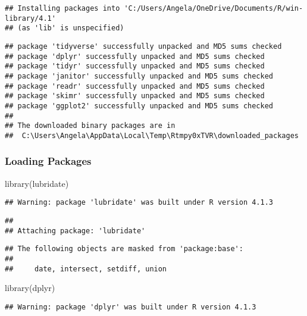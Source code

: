 \documentclass[
]{article}
\newenvironment{Shaded}{\begin{snugshade}}{\end{snugshade}}
\newcommand{\FunctionTok}[1]{\textcolor[rgb]{0.00,0.00,0.00}{#1}}
\newcommand{\NormalTok}[1]{#1}
\begin{document}
\begin{verbatim}
## Installing packages into 'C:/Users/Angela/OneDrive/Documents/R/win-library/4.1'
## (as 'lib' is unspecified)
\end{verbatim}

\begin{verbatim}
## package 'tidyverse' successfully unpacked and MD5 sums checked
## package 'dplyr' successfully unpacked and MD5 sums checked
## package 'tidyr' successfully unpacked and MD5 sums checked
## package 'janitor' successfully unpacked and MD5 sums checked
## package 'readr' successfully unpacked and MD5 sums checked
## package 'skimr' successfully unpacked and MD5 sums checked
## package 'ggplot2' successfully unpacked and MD5 sums checked
## 
## The downloaded binary packages are in
##  C:\Users\Angela\AppData\Local\Temp\Rtmpy0xTVR\downloaded_packages
\end{verbatim}

\hypertarget{loading-packages}{%
\subsubsection{Loading Packages}\label{loading-packages}}

\begin{Shaded}
\begin{Highlighting}[]
\FunctionTok{library}\NormalTok{(lubridate)}
\end{Highlighting}
\end{Shaded}

\begin{verbatim}
## Warning: package 'lubridate' was built under R version 4.1.3
\end{verbatim}

\begin{verbatim}
## 
## Attaching package: 'lubridate'
\end{verbatim}

\begin{verbatim}
## The following objects are masked from 'package:base':
## 
##     date, intersect, setdiff, union
\end{verbatim}

\begin{Shaded}
\begin{Highlighting}[]
\FunctionTok{library}\NormalTok{(dplyr)}
\end{Highlighting}
\end{Shaded}

\begin{verbatim}
## Warning: package 'dplyr' was built under R version 4.1.3
\end{verbatim}
\end{document}
